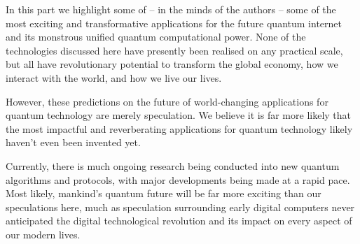 %
%

In this part we highlight some of -- in the minds of the authors -- some of the most exciting and transformative applications for the future quantum internet and its monstrous unified quantum computational power. None of the technologies discussed here have presently been realised on any practical scale, but all have revolutionary potential to transform the global economy, how we interact with the world, and how we live our lives.

However, these predictions on the future of world-changing applications for quantum technology are merely speculation. We believe it is far more likely that the most impactful and reverberating applications for quantum technology likely haven't even been invented yet.

Currently, there is much ongoing research being conducted into new quantum algorithms and protocols, with major developments being made at a rapid pace. Most likely, mankind's quantum future will be far more exciting than our speculations here, much as speculation surrounding early digital computers never anticipated the digital technological revolution and its impact on every aspect of our modern lives.
